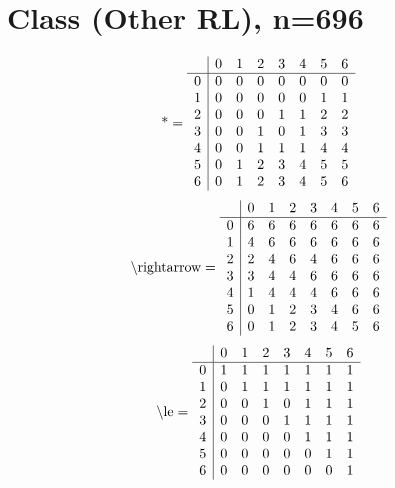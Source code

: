 \documentclass[11pt]{article}
\begin{document}
\section{Class (Other RL), n=696}
\[\text{*} = 
\begin{array}{r | r r r r r r r}
 & 0 & 1 & 2 & 3 & 4 & 5 & 6 \\ \hline
0 & 0 & 0 & 0 & 0 & 0 & 0 & 0 \\
1 & 0 & 0 & 0 & 0 & 0 & 1 & 1 \\
2 & 0 & 0 & 0 & 1 & 1 & 2 & 2 \\
3 & 0 & 0 & 1 & 0 & 1 & 3 & 3 \\
4 & 0 & 0 & 1 & 1 & 1 & 4 & 4 \\
5 & 0 & 1 & 2 & 3 & 4 & 5 & 5 \\
6 & 0 & 1 & 2 & 3 & 4 & 5 & 6 \\
\end{array}
\]
\[\text{\textbackslash rightarrow} = 
\begin{array}{r | r r r r r r r}
 & 0 & 1 & 2 & 3 & 4 & 5 & 6 \\ \hline
0 & 6 & 6 & 6 & 6 & 6 & 6 & 6 \\
1 & 4 & 6 & 6 & 6 & 6 & 6 & 6 \\
2 & 2 & 4 & 6 & 4 & 6 & 6 & 6 \\
3 & 3 & 4 & 4 & 6 & 6 & 6 & 6 \\
4 & 1 & 4 & 4 & 4 & 6 & 6 & 6 \\
5 & 0 & 1 & 2 & 3 & 4 & 6 & 6 \\
6 & 0 & 1 & 2 & 3 & 4 & 5 & 6 \\
\end{array}
\]
\[\text{\textbackslash le} = 
\begin{array}{r | r r r r r r r}
 & 0 & 1 & 2 & 3 & 4 & 5 & 6 \\ \hline
0 & 1 & 1 & 1 & 1 & 1 & 1 & 1 \\
1 & 0 & 1 & 1 & 1 & 1 & 1 & 1 \\
2 & 0 & 0 & 1 & 0 & 1 & 1 & 1 \\
3 & 0 & 0 & 0 & 1 & 1 & 1 & 1 \\
4 & 0 & 0 & 0 & 0 & 1 & 1 & 1 \\
5 & 0 & 0 & 0 & 0 & 0 & 1 & 1 \\
6 & 0 & 0 & 0 & 0 & 0 & 0 & 1 \\
\end{array}
\]
\end{document}
